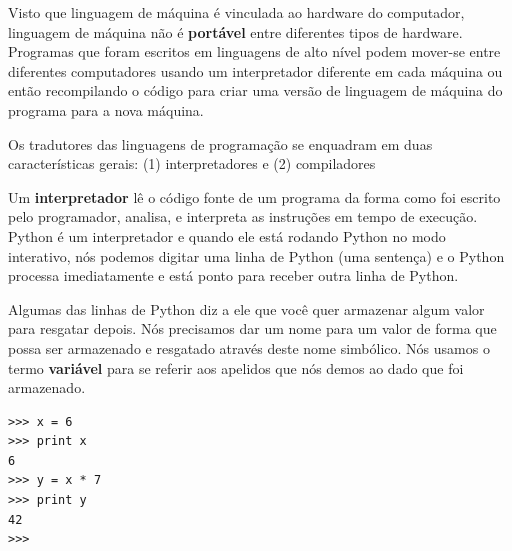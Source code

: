 Visto que linguagem de máquina é vinculada ao hardware do computador,
linguagem de máquina não é {\bf portável} entre diferentes tipos de hardware.
Programas que foram escritos em linguagens de alto nível podem mover-se
entre diferentes computadores usando um interpretador diferente em cada máquina
ou então recompilando o código para criar uma versão de linguagem de máquina do
programa para a nova máquina.
%

Os tradutores das linguagens de programação se enquadram em duas 
características gerais: 
(1) interpretadores e (2) compiladores
%

Um {\bf interpretador} lê o código fonte de um programa da forma como foi escrito 
pelo programador, analisa, e interpreta as instruções em tempo de 
execução. Python é um interpretador e quando ele está rodando Python no modo 
interativo, nós podemos digitar uma linha de Python (uma sentença) e o Python 
processa imediatamente e está ponto para receber outra linha de Python.
%

Algumas das linhas de Python diz a ele que você quer armazenar algum valor
para resgatar depois. Nós precisamos dar um nome para um valor de forma que possa
ser armazenado e resgatado através deste nome simbólico. Nós usamos o termo
{\bf variável} para se referir aos apelidos que nós demos ao dado que foi armazenado.
%

\beforeverb
\begin{verbatim}
>>> x = 6
>>> print x
6
>>> y = x * 7
>>> print y
42
>>> 
\end{verbatim}
\afterverb

